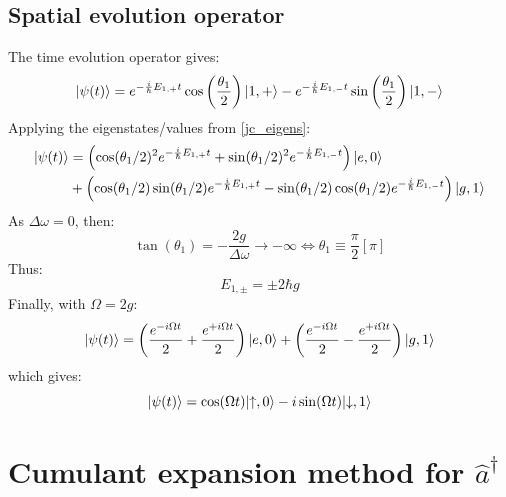 \documentclass[10pt]{report}
\DeclarePairedDelimiter\ket{\lvert}{\rangle}
\begin{document}
\subsection{Spatial evolution operator}
\label{spatial_evol_op}

The time evolution operator gives:
\begin{equation}
\ket{\psi(t)} = e^{-\frac{i}{\hbar}E_{1,+}t} \cos\left(\frac{\theta_{1}}{2}\right) \ket{1, +} - e^{-\frac{i}{\hbar}E_{1,-}t} \sin\left(\frac{\theta_{1}}{2}\right) \ket{1, -}
\end{equation}
Applying the eigenstates/values from \ref{jc_eigens}:
\begin{align}
\begin{split}
\ket{\psi(t)} &= \left( \cos(\theta_1/2)^2 e^{-\frac{i}{\hbar}E_{1,+}t} + \sin(\theta_1/2)^2 e^{-\frac{i}{\hbar}E_{1,-}t} \right) \ket{e, 0} \\
&+ \left( \cos(\theta_1/2) \sin(\theta_1/2) e^{-\frac{i}{\hbar}E_{1,+}t} - \sin(\theta_1/2) \cos(\theta_1/2) e^{-\frac{i}{\hbar}E_{1,-}t} \right) \ket{g, 1}
\end{split}
\end{align}
As $\Delta\omega = 0$, then:
\begin{equation}
\tan(\theta_1) = -\frac{2g}{\Delta\omega} \rightarrow -\infty \Leftrightarrow \theta_1 \equiv \frac{\pi}{2} \left[\pi\right]
\end{equation}
Thus:
\begin{equation}
E_{1,\pm} = \pm 2\hbar g
\end{equation}
Finally, with $\Omega = 2g$:
\begin{equation}
\ket{\psi(t)} = \left( \frac{e^{-i\Omega t}}{2} + \frac{e^{+i\Omega t}}{2} \right) \ket{e, 0} + \left( \frac{e^{-i\Omega t}}{2} - \frac{e^{+i\Omega t}}{2} \right) \ket{g, 1}
\end{equation}
which gives:
\begin{equation}
\ket{\psi(t)} = \cos(\Omega t) \ket{\uparrow, 0} - i \sin(\Omega t) \ket{\downarrow, 1}
\end{equation}

\section{Cumulant expansion method for $\hat{a}^\dag$}
\label{cumu_exp_for_ad}
\end{document}
